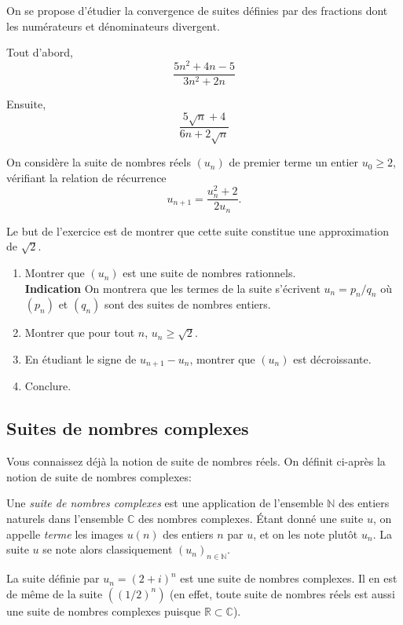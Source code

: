 \documentclass[12pt]{article}
\newcommand{\RR}{\mathbb R}
\newcommand{\CC}{\mathbb C}
\newcommand{\NN}{\mathbb N}
\theoremstyle{definition}
\theoremstyle{theorem}
\begin{document}
\begin{exer}
On se propose d'étudier la convergence de suites définies par des fractions dont les numérateurs et dénominateurs divergent.

Tout d'abord,
\[
\dfrac{5n^2 + 4n - 5}{3n^2+2n}
\]

Ensuite,
\[
\frac{5\sqrt n + 4}{6n + 2\sqrt n}\]

\end{exer}

\begin{exer}
	On considère la suite de nombres réels $(u_n)$ de premier terme un entier $u_0\geq 2$, vérifiant la relation de récurrence \[
	u_{n+1} = \frac{u_n^2+2}{2u_n}.
	\]
	
	Le but de l'exercice est de montrer que cette suite constitue une approximation de $\sqrt{2}$.
	\begin{enumerate}
		\item Montrer que $(u_n)$ est une suite de nombres rationnels.\\
		\textbf{Indication} On montrera que les termes de la suite s'écrivent $u_n = p_n/q_n$ où $(p_n)$ et $(q_n)$ sont des suites de nombres entiers.
		\item Montrer que pour tout $n$, $u_n \geq \sqrt 2$.
		\item En étudiant le signe de $u_{n+1} - u_n$, montrer que $(u_n)$ est décroissante.
		\item Conclure.
	\end{enumerate}
\end{exer}

\subsection*{Suites de nombres complexes}

Vous connaissez déjà la notion de suite de nombres réels. On définit ci-après la notion de suite de nombres complexes:
\begin{defn}
Une \textit{suite de nombres complexes} est une application de l'ensemble $\NN$ des entiers naturels dans l'ensemble $\CC$ des nombres complexes. Étant donné une suite $u$, on appelle \textit{terme} les images $u(n)$ des entiers $n$ par $u$, et on les note plutôt $u_n$. La suite $u$ se note alors classiquement $(u_n)_{n\in\NN}$.
\end{defn}

\begin{exem}
La suite définie par $u_n = (2+i)^n$ est une suite de nombres complexes. Il en est de même de la suite $\left((1/2)^n\right)$ (en effet, toute suite de nombres réels est aussi une suite de nombres complexes puisque $\RR\subset \CC$).
\end{exem}
\end{document}
